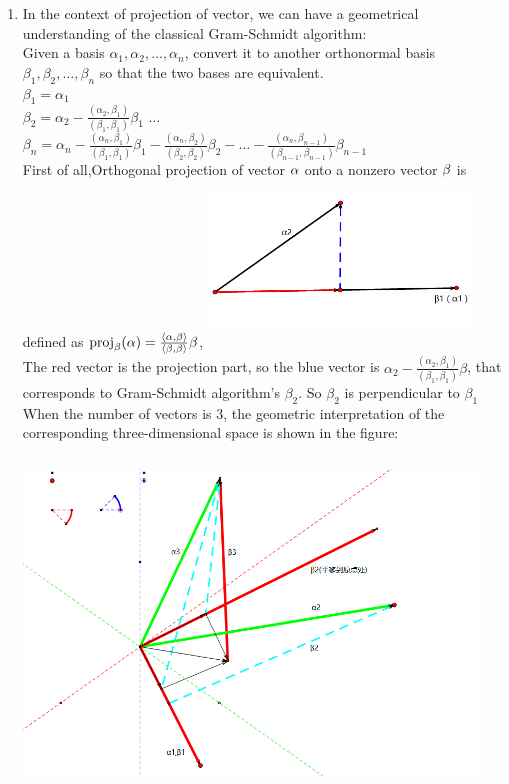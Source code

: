 \documentclass[english,onecolumn]{IEEEtran}
\begin{document}
\begin{enumerate}
\item In the context of projection of vector, we can have a geometrical understanding of the classical Gram-Schmidt algorithm:
\\Given a basis $\alpha_{1}, \alpha_{2}, \ldots, \alpha_{n}$, convert it to another orthonormal basis $\beta_{1}, \beta_{2}, \ldots, \beta_{n}$ so that the two bases are equivalent.
\\$\beta_{1}=\alpha_{1}$
\\$\beta_{2}=\alpha_{2}-\frac{\left(\alpha_{2}, \beta_{1}\right)}{\left(\beta_{1}, \beta_{1}\right)} \beta_{1}$
$\ldots$
\\$\beta_{n}=\alpha_{n}-\frac{\left(\alpha_{n}, \beta_{1}\right)}{\left(\beta_{1}, \beta_{1}\right)} \beta_{1}-\frac{\left(\alpha_{n}, \beta_{2}\right)}{\left(\beta_{2}, \beta_{2}\right)} \beta_{2}-\ldots-\frac{\left(\alpha_{n}, \beta_{n-1}\right)}{\left(\beta_{n-1}, \beta_{n-1}\right)} \beta_{n-1}$
\\First of all,Orthogonal projection of vector ${\bf \alpha}$ onto a nonzero vector ${\bf\beta}$ is defined as
	$\text{proj}_\mathbf{\beta}(\bf \alpha)=\frac{\langle{\bf \alpha},{\bf \beta}\rangle}{\langle{\bf \beta},{\bf \beta}\rangle}{\bf \beta}$, \includegraphics[width=2.77in,height=1.75in]{1.jpg} 
\\The red vector is the projection part, so the blue vector is $\alpha_{2}-\frac{\left(\alpha_{2}, \beta_{1}\right)}{\left(\beta_{1}, \beta_{1}\right)} \beta$, that corresponds to Gram-Schmidt algorithm's $\beta_2$. So $\beta_2$ is perpendicular to $\beta_1$
\\When the number of vectors is 3, the geometric interpretation of the corresponding three-dimensional space is shown in the figure:
\includegraphics[width=4.77in,height=3.75in]{2.jpg} 

\end{enumerate}
\end{document}
